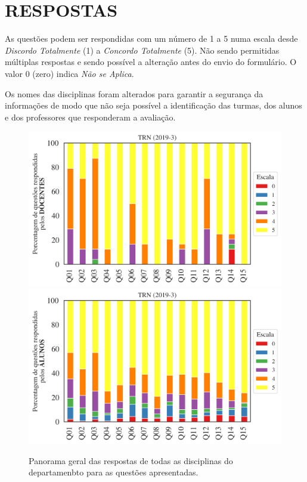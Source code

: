 \documentclass[a4paper,10pt]{article}
\begin{document}
\section{RESPOSTAS}
As questões podem ser respondidas com um número de 1 a 5 numa escala desde {\it Discordo Totalmente} (1) a {\it Concordo Totalmente} (5). Não sendo permitidas múltiplas respostas e sendo possível a alteração antes do envio do formulário. O valor 0 (zero) indica {\it Não se Aplica}.

Os nomes das disciplinas foram alterados para garantir a segurança da informações de modo que não seja possível a identificação das turmas, dos alunos  e dos professores que responderam a avaliação.

\begin{figure}[h]
\centering
\includegraphics[width=0.85\linewidth]{analise_geral_departamento_TRN_docentes.png}
\includegraphics[width=0.85\linewidth]{analise_geral_departamento_TRN_alunos.png}
\caption{\label{fig:analise_geral_departamento}            Panorama geral das respostas de todas as  disciplinas do departamenbto para as questões apresentadas.}
\end{figure}
\end{document}
